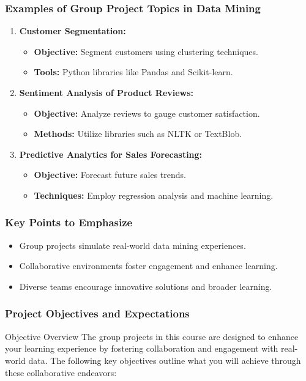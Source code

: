 \documentclass[aspectratio=169]{beamer}
\begin{document}
\begin{frame}[fragile]
    \frametitle{Examples of Group Project Topics in Data Mining}
    \begin{enumerate}
        \item \textbf{Customer Segmentation:}
            \begin{itemize}
                \item \textbf{Objective:} Segment customers using clustering techniques.
                \item \textbf{Tools:} Python libraries like Pandas and Scikit-learn.
            \end{itemize}

        \item \textbf{Sentiment Analysis of Product Reviews:}
            \begin{itemize}
                \item \textbf{Objective:} Analyze reviews to gauge customer satisfaction.
                \item \textbf{Methods:} Utilize libraries such as NLTK or TextBlob.
            \end{itemize}

        \item \textbf{Predictive Analytics for Sales Forecasting:}
            \begin{itemize}
                \item \textbf{Objective:} Forecast future sales trends.
                \item \textbf{Techniques:} Employ regression analysis and machine learning.
            \end{itemize}
    \end{enumerate}
\end{frame}

\begin{frame}[fragile]
    \frametitle{Key Points to Emphasize}
    \begin{itemize}
        \item Group projects simulate real-world data mining experiences.
        \item Collaborative environments foster engagement and enhance learning.
        \item Diverse teams encourage innovative solutions and broader learning.
    \end{itemize}
\end{frame}

\begin{frame}[fragile]
    \frametitle{Project Objectives and Expectations}
    \begin{block}{Objective Overview}
        The group projects in this course are designed to enhance your learning experience by fostering collaboration and engagement with real-world data. The following key objectives outline what you will achieve through these collaborative endeavors:
    \end{block}
\end{frame}
\end{document}
